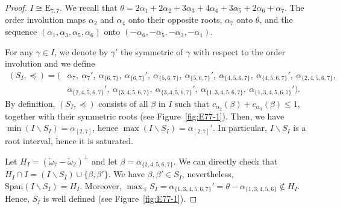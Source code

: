 \documentclass[10pt]{amsart}
\theoremstyle{definition}
\theoremstyle{remark}
\newcommand\nl{\par\noindent}
\newcommand\smeno{\smallsetminus}
\newcommand\gen{\mathrm{Span}}
\newcommand\al{\alpha}
\newcommand\be{\beta}
\newcommand\ga{\gamma}
\newcommand\preq{\preccurlyeq}
\renewcommand{\leq}{\leqslant}
\begin{document}
\begin{proof}
\bigskip

\nl {\bf E7.} $I\cong \mathrm E_{7, 7}$. 
We recall that $\theta=2\al_1+2\al_2+3\al_3+4\al_4+3\al_5+2\al_6+\al_7$. 
The order involution maps $\al_2$ and $\al_4$ onto their opposite roots, $\al_7$ onto $\theta$, and the sequence $(\al_1, \al_3,\al_5, \al_6)$ onto $(-\al_6, -\al_5, -\al_3, -\al_1)$.
\par
For any $\ga\in I$, we denote by $\ga'$ the symmetric of $\ga$ with respect to the order involution and we define
\begin{align*}
(S_I, \preq)=
(&\al_7,\: \al_7',\: 
\al_{\{6, 7\}},\ \al_{\{6, 7\}}',\ 
\al_{\{5, 6,7\}},\ \al_{\{5, 6,7\}}',\ 
\al_{\{4, 5, 6,7\}},\ \al_{\{4, 5, 6,7\}}',\ 
\al_{\{2, 4, 5, 6,7\}},\\
&\al_{\{2, 4, 5, 6,7\}}',\ 
\al_{\{3, 4, 5, 6,7\}},\ \al_{\{3, 4, 5, 6,7\}}',\ 
\al_{\{1, 3, 4, 5, 6,7\}},\ \al_{\{1, 3, 4, 5, 6,7\}}').
\end{align*}
By definition, $(S_I,\preq)$ consists of all $\be$ in $I$ such that $c_{\al_2}(\be)+c_{\al_3}(\be)\leq 1$, together with their symmetric roots  (see Figure~\ref{fig:E77-1}).
Then, we have $\min(I\smeno S_I)=\al_{[2,7]}$, hence $\max(I\smeno S_I)=\al_{[2,7]}'$. 
In particular,  $I\smeno S_I$ is a root interval, hence it is saturated.

\par
Let $H_I=(\check\omega_7-\check\omega_2)^\perp$ and let $\be=\al_{\{2, 4, 5, 6,7\}}$. 
We can directly check that $H_I\cap I=(I\smeno S_I)\cup \{\be, \be'\}$. 
We have $\be, \be'\in S_I$, nevertheless, $\gen(I\smeno S_I)=H_I$.
Moreover, $\max_\preq S_I=\al_{\{1, 3, 4, 5, 6,7\}}'=\theta-\al_{\{1, 3, 4, 5, 6\}}\not\in H_I$. 
Hence, $S_I$ is well defined (see Figure~\ref{fig:E77-1}).


\end{proof}
\end{document}
